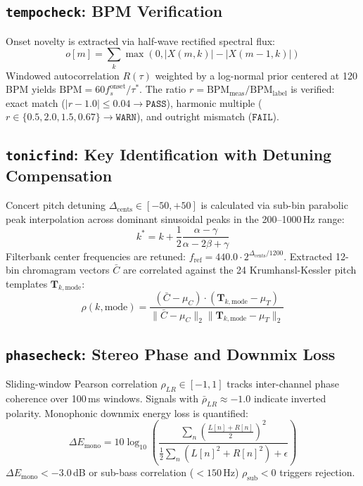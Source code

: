 \documentclass[10pt,journal,compsoc]{IEEEtran}
\begin{document}
\subsection{\texttt{tempocheck}: BPM Verification}
Onset novelty is extracted via half-wave rectified spectral flux:
\begin{equation}
o[m] = \sum_{k} \max(0, |X(m, k)| - |X(m-1, k)|)
\end{equation}
Windowed autocorrelation $R(\tau)$ weighted by a log-normal prior centered at 120\,BPM yields $\text{BPM} = 60 f_s^{\text{onset}} / \tau^*$. The ratio $r = \text{BPM}_{\text{meas}} / \text{BPM}_{\text{label}}$ is verified: exact match ($|r - 1.0| \le 0.04 \rightarrow \texttt{PASS}$), harmonic multiple ($r \in \{0.5, 2.0, 1.5, 0.67\} \rightarrow \texttt{WARN}$), and outright mismatch ($\texttt{FAIL}$).

\subsection{\texttt{tonicfind}: Key Identification with Detuning Compensation}
Concert pitch detuning $\Delta_{\text{cents}} \in [-50, +50]$ is calculated via sub-bin parabolic peak interpolation across dominant sinusoidal peaks in the 200--1000\,Hz range:
\begin{equation}
k^* = k + \frac{1}{2} \frac{\alpha - \gamma}{\alpha - 2\beta + \gamma}
\end{equation}
Filterbank center frequencies are retuned: $f_{\text{ref}} = 440.0 \cdot 2^{\Delta_{\text{cents}}/1200}$. Extracted 12-bin chromagram vectors $\bar{C}$ are correlated against the 24 Krumhansl-Kessler pitch templates $\mathbf{T}_{k, \text{mode}}$:
\begin{equation}
\rho(k, \text{mode}) = \frac{(\bar{C} - \mu_C) \cdot (\mathbf{T}_{k, \text{mode}} - \mu_T)}{\|\bar{C} - \mu_C\|_2 \|\mathbf{T}_{k, \text{mode}} - \mu_T\|_2}
\end{equation}

\subsection{\texttt{phasecheck}: Stereo Phase and Downmix Loss}
Sliding-window Pearson correlation $\rho_{LR} \in [-1, 1]$ tracks inter-channel phase coherence over 100\,ms windows. Signals with $\bar{\rho}_{LR} \approx -1.0$ indicate inverted polarity. Monophonic downmix energy loss is quantified:
\begin{equation}
\Delta E_{\text{mono}} = 10 \log_{10} \left( \frac{\sum_n \left( \frac{L[n] + R[n]}{2} \right)^2}{\frac{1}{2} \sum_n (L[n]^2 + R[n]^2) + \epsilon} \right)
\end{equation}
$\Delta E_{\text{mono}} < -3.0$\,dB or sub-bass correlation ($<150$\,Hz) $\rho_{\text{sub}} < 0$ triggers rejection.
\end{document}
